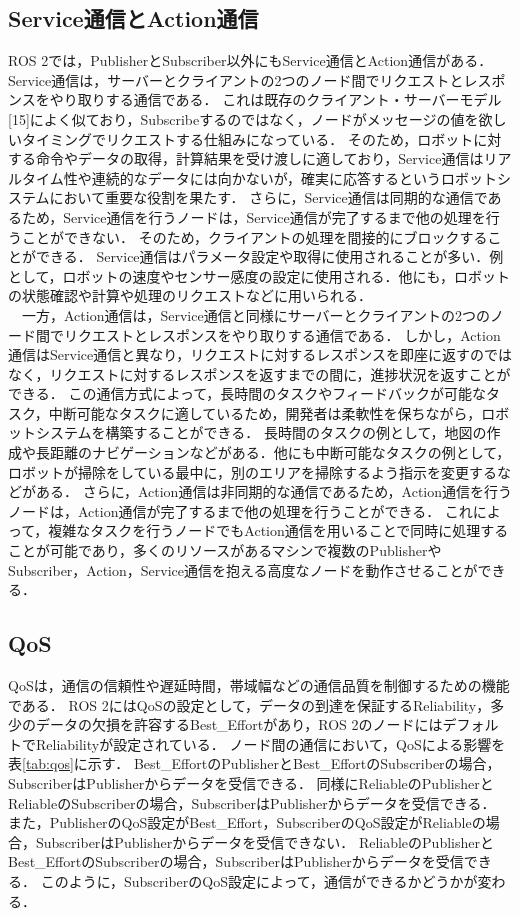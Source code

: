 \subsection{Service通信とAction通信}
ROS 2では，PublisherとSubscriber以外にもService通信とAction通信がある．
Service通信は，サーバーとクライアントの2つのノード間でリクエストとレスポンスをやり取りする通信である．
これは既存のクライアント・サーバーモデル[15]によく似ており，Subscribeするのではなく，ノードがメッセージの値を欲しいタイミングでリクエストする仕組みになっている．
そのため，ロボットに対する命令やデータの取得，計算結果を受け渡しに適しており，Service通信はリアルタイム性や連続的なデータには向かないが，確実に応答するというロボットシステムにおいて重要な役割を果たす．
さらに，Service通信は同期的な通信であるため，Service通信を行うノードは，Service通信が完了するまで他の処理を行うことができない．
そのため，クライアントの処理を間接的にブロックすることができる．
Service通信はパラメータ設定や取得に使用されることが多い．例として，ロボットの速度やセンサー感度の設定に使用される．他にも，ロボットの状態確認や計算や処理のリクエストなどに用いられる．
\\　一方，Action通信は，Service通信と同様にサーバーとクライアントの2つのノード間でリクエストとレスポンスをやり取りする通信である．
しかし，Action通信はService通信と異なり，リクエストに対するレスポンスを即座に返すのではなく，リクエストに対するレスポンスを返すまでの間に，進捗状況を返すことができる．
この通信方式によって，長時間のタスクやフィードバックが可能なタスク，中断可能なタスクに適しているため，開発者は柔軟性を保ちながら，ロボットシステムを構築することができる．
長時間のタスクの例として，地図の作成や長距離のナビゲーションなどがある．他にも中断可能なタスクの例として，ロボットが掃除をしている最中に，別のエリアを掃除するよう指示を変更するなどがある．
さらに，Action通信は非同期的な通信であるため，Action通信を行うノードは，Action通信が完了するまで他の処理を行うことができる．
これによって，複雑なタスクを行うノードでもAction通信を用いることで同時に処理することが可能であり，多くのリソースがあるマシンで複数のPublisherやSubscriber，Action，Service通信を抱える高度なノードを動作させることができる．
\subsection{QoS}
 QoSは，通信の信頼性や遅延時間，帯域幅などの通信品質を制御するための機能である．
 ROS 2にはQoSの設定として，データの到達を保証するReliability，多少のデータの欠損を許容するBest\_Effortがあり，ROS 2のノードにはデフォルトでReliabilityが設定されている．
 ノード間の通信において，QoSによる影響を表\ref{tab:qos}に示す．
Best\_EffortのPublisherとBest\_EffortのSubscriberの場合，SubscriberはPublisherからデータを受信できる．
同様にReliableのPublisherとReliableのSubscriberの場合，SubscriberはPublisherからデータを受信できる．
また，PublisherのQoS設定がBest\_Effort，SubscriberのQoS設定がReliableの場合，SubscriberはPublisherからデータを受信できない．
ReliableのPublisherとBest\_EffortのSubscriberの場合，SubscriberはPublisherからデータを受信できる．
このように，SubscriberのQoS設定によって，通信ができるかどうかが変わる．
